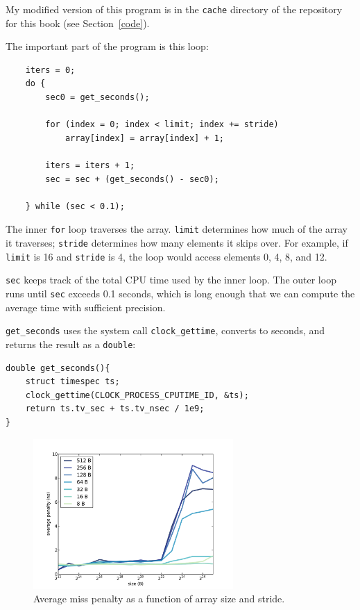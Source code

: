 \documentclass[12pt]{book}
\begin{document}
My modified version of this program is in the {\tt cache} directory
of the repository for this
book (see Section~\ref{code}).

The important part of the program is this loop:

\begin{verbatim}
    iters = 0;
    do {
        sec0 = get_seconds();

        for (index = 0; index < limit; index += stride) 
            array[index] = array[index] + 1;
        
        iters = iters + 1; 
        sec = sec + (get_seconds() - sec0);
        
    } while (sec < 0.1);
\end{verbatim}

The inner {\tt for} loop traverses the array.  {\tt limit}
determines how much of the array it traverses; {\tt stride}
determines how many elements it skips over.  For example, if
{\tt limit} is 16 and {\tt stride} is 4, the loop would access
elements 0, 4, 8, and 12.

{\tt sec} keeps track of the total CPU time used by the inner loop.
The outer loop runs until {\tt sec} exceeds 0.1 seconds, which is
long enough that we can compute the average time with sufficient
precision.

\verb"get_seconds" uses the system call \verb"clock_gettime",
converts to seconds, and returns the result as a {\tt double}:

\begin{verbatim}
double get_seconds(){
    struct timespec ts;
    clock_gettime(CLOCK_PROCESS_CPUTIME_ID, &ts);
    return ts.tv_sec + ts.tv_nsec / 1e9;
}
\end{verbatim}

\begin{figure}
\centerline{\includegraphics[width=3in]{figs/cache_data.pdf}}
\caption{Average miss penalty as a function of array size and stride.}
\label{cachedata}
\end{figure}
\end{document}
